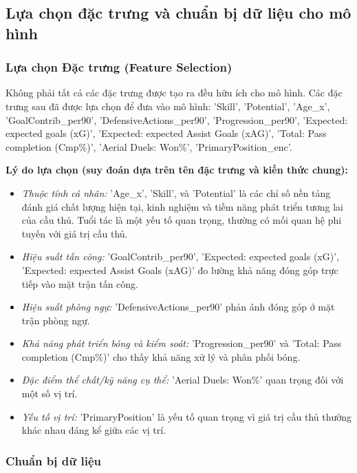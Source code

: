 \documentclass[12pt, a4paper]{report}
\begin{document}
\subsection{Lựa chọn đặc trưng và chuẩn bị dữ liệu cho mô hình}
\subsubsection{Lựa chọn Đặc trưng (Feature Selection)}

Không phải tất cả các đặc trưng được tạo ra đều hữu ích cho mô hình. Các đặc trưng sau đã được lựa chọn để đưa vào mô hình:
'Skill', 
'Potential', 
'Age\_x', 
'GoalContrib\_per90', 
'DefensiveActions\_per90', 
'Progression\_per90', 
'Expected: expected goals (xG)', 
'Expected: expected Assist Goals (xAG)', 
'Total: Pass completion (Cmp\%)', 
'Aerial Duels: Won\%', 
'PrimaryPosition\_enc'.

\textbf{Lý do lựa chọn (suy đoán dựa trên tên đặc trưng và kiến thức chung):}
\begin{itemize}
    \item \textit{Thuộc tính cá nhân:} 'Age\_x', 'Skill', và 'Potential' là các chỉ số nền tảng đánh giá chất lượng hiện tại, kinh nghiệm và tiềm năng phát triển tương lai của cầu thủ. Tuổi tác là một yếu tố quan trọng, thường có mối quan hệ phi tuyến với giá trị cầu thủ.
    \item \textit{Hiệu suất tấn công:} 'GoalContrib\_per90', 'Expected: expected goals (xG)', 'Expected: expected Assist Goals (xAG)' đo lường khả năng đóng góp trực tiếp vào mặt trận tấn công.
    \item \textit{Hiệu suất phòng ngự:} 'DefensiveActions\_per90' phản ánh đóng góp ở mặt trận phòng ngự.
    \item \textit{Khả năng phát triển bóng và kiểm soát:} 'Progression\_per90' và 'Total: Pass completion (Cmp\%)' cho thấy khả năng xử lý và phân phối bóng.
    \item \textit{Đặc điểm thể chất/kỹ năng cụ thể:} 'Aerial Duels: Won\%' quan trọng đối với một số vị trí.
    \item \textit{Yếu tố vị trí:} 'PrimaryPosition' là yếu tố quan trọng vì giá trị cầu thủ thường khác nhau đáng kể giữa các vị trí.
\end{itemize}

\subsubsection{Chuẩn bị dữ liệu}
\end{document}
